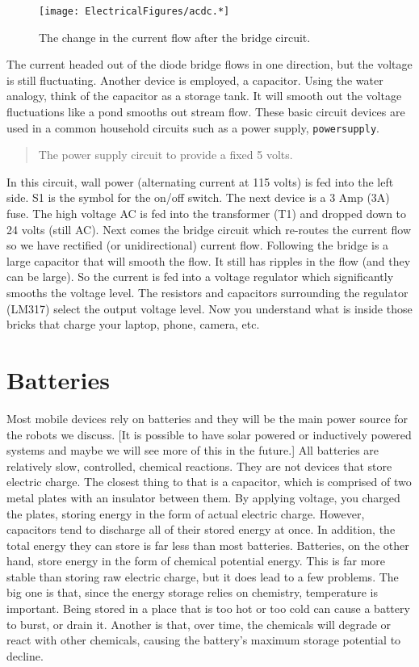 \begin{figure}
\centering
\texttt{[image: ElectricalFigures/acdc.*]}
\caption{The change in the current flow after the bridge circuit.}
\end{figure}

The current headed out of the diode bridge flows in one direction, but
the voltage is still fluctuating. Another device is employed, a
capacitor. Using the water analogy, think of the capacitor as a storage
tank. It will smooth out the voltage fluctuations like a pond smooths
out stream flow. These basic circuit devices are used in a common
household circuits such as a power supply, \texttt{powersupply}.

\begin{quote}
The power supply circuit to provide a fixed 5 volts.
\end{quote}

In this circuit, wall power (alternating current at 115 volts) is fed
into the left side. S1 is the symbol for the on/off switch. The next
device is a 3 Amp (3A) fuse. The high voltage AC is fed into the
transformer (T1) and dropped down to 24 volts (still AC). Next comes the
bridge circuit which re-routes the current flow so we have rectified (or
unidirectional) current flow. Following the bridge is a large capacitor
that will smooth the flow. It still has ripples in the flow (and they
can be large). So the current is fed into a voltage regulator which
significantly smooths the voltage level. The resistors and capacitors
surrounding the regulator (LM317) select the output voltage level. Now
you understand what is inside those bricks that charge your laptop,
phone, camera, etc.

\hypertarget{batteries}{%
\section{Batteries}\label{batteries}}

Most mobile devices rely on batteries and they will be the main power
source for the robots we discuss. {[}It is possible to have solar
powered or inductively powered systems and maybe we will see more of
this in the future.{]} All batteries are relatively slow, controlled,
chemical reactions. They are not devices that store electric charge. The
closest thing to that is a capacitor, which is comprised of two metal
plates with an insulator between them. By applying voltage, you charged
the plates, storing energy in the form of actual electric charge.
However, capacitors tend to discharge all of their stored energy at
once. In addition, the total energy they can store is far less than most
batteries. Batteries, on the other hand, store energy in the form of
chemical potential energy. This is far more stable than storing raw
electric charge, but it does lead to a few problems. The big one is
that, since the energy storage relies on chemistry, temperature is
important. Being stored in a place that is too hot or too cold can cause
a battery to burst, or drain it. Another is that, over time, the
chemicals will degrade or react with other chemicals, causing the
battery's maximum storage potential to decline.


